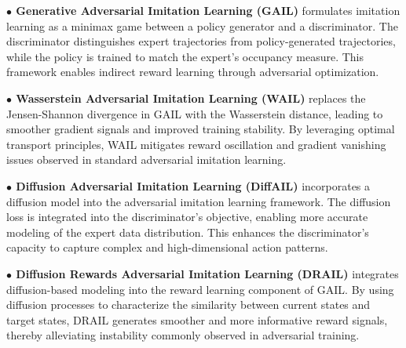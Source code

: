\documentclass[journal]{IEEEtran}
\begin{document}
\textbf{$\bullet$ Generative Adversarial Imitation Learning (GAIL)}\cite{ho2016generative} formulates imitation learning as a minimax game between a policy generator and a discriminator. The discriminator distinguishes expert trajectories from policy-generated trajectories, while the policy is trained to match the expert's occupancy measure. This framework enables indirect reward learning through adversarial optimization.

\textbf{$\bullet$ Wasserstein Adversarial Imitation Learning (WAIL)}\cite{xiao2019wasserstein} replaces the Jensen-Shannon divergence in GAIL with the Wasserstein distance, leading to smoother gradient signals and improved training stability. By leveraging optimal transport principles, WAIL mitigates reward oscillation and gradient vanishing issues observed in standard adversarial imitation learning.

\textbf{$\bullet$ Diffusion Adversarial Imitation Learning (DiffAIL)}\cite{wang2024diffail} incorporates a diffusion model into the adversarial imitation learning framework. The diffusion loss is integrated into the discriminator's objective, enabling more accurate modeling of the expert data distribution. This enhances the discriminator's capacity to capture complex and high-dimensional action patterns.

\textbf{$\bullet$ Diffusion Rewards Adversarial Imitation Learning (DRAIL)}\cite{lai2024diffusion} integrates diffusion-based modeling into the reward learning component of GAIL. By using diffusion processes to characterize the similarity between current states and target states, DRAIL generates smoother and more informative reward signals, thereby alleviating instability commonly observed in adversarial training.
\end{document}
